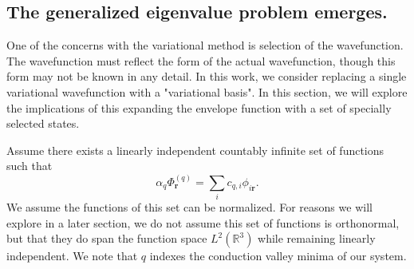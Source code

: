 \subsection{The generalized eigenvalue problem emerges.}
One of the concerns with the variational method is selection of the
wavefunction. The wavefunction must reflect the form of the actual wavefunction,
though this form may not be known in any detail. In this work, we consider
replacing a single variational wavefunction with a "variational basis". In this
section, we will explore the implications of this expanding the envelope
function with a set of specially selected states. 

Assume there exists a linearly independent countably infinite set of functions
such that
\begin{equation}
  \alpha_{q}\Phi^{(q)}_{\bm{r}}
  =
  \sum_{i} c_{q,i} \phi_{i\bm{r}}.
  \label{expand_def}
\end{equation}
We assume the functions of this set can be normalized. For reasons we will
explore in a later section, we do not assume this set of functions is
orthonormal, but that they do span the function space $L^{2}\left(
\mathbb{R}^{3}\right)$ while remaining linearly independent. We note that $q$
indexes the conduction valley minima of our system. 

